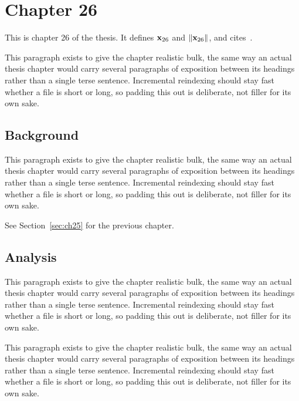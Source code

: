 \section{Chapter 26}
\label{sec:ch26}

This is chapter 26 of the thesis. It defines $\mathbf{x}_{26}$ and $\lVert \mathbf{x}_{26} \rVert$, and cites~\cite{ref1}.

This paragraph exists to give the chapter realistic bulk, the same way an actual thesis chapter would carry several paragraphs of exposition between its headings rather than a single terse sentence. Incremental reindexing should stay fast whether a file is short or long, so padding this out is deliberate, not filler for its own sake.

\subsection{Background}
\label{sec:ch26:background}

This paragraph exists to give the chapter realistic bulk, the same way an actual thesis chapter would carry several paragraphs of exposition between its headings rather than a single terse sentence. Incremental reindexing should stay fast whether a file is short or long, so padding this out is deliberate, not filler for its own sake.

See Section~\ref{sec:ch25} for the previous chapter.

\subsection{Analysis}
\label{sec:ch26:analysis}

This paragraph exists to give the chapter realistic bulk, the same way an actual thesis chapter would carry several paragraphs of exposition between its headings rather than a single terse sentence. Incremental reindexing should stay fast whether a file is short or long, so padding this out is deliberate, not filler for its own sake.

This paragraph exists to give the chapter realistic bulk, the same way an actual thesis chapter would carry several paragraphs of exposition between its headings rather than a single terse sentence. Incremental reindexing should stay fast whether a file is short or long, so padding this out is deliberate, not filler for its own sake.
